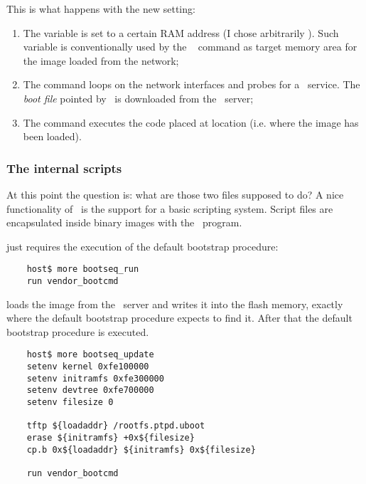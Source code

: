         This is what happens with the new setting:
        \begin{enumerate}
        \item   The  variable is set to a certain RAM
                address (I chose arbitrarily ). Such
                variable is conventionally used by the \uBoot\
                 command as target memory area for the image
                loaded from the network;
        \item   The  command loops on the network interfaces
                and probes for a \BootP\ service. The \emph{boot file}
                pointed by \BootP\ is downloaded from the \TFTP\ server;
        \item   The \Command{source} command executes the code placed at
                location \Const{0x100000} (i.e. where the image has been
                loaded).
        \end{enumerate}

    \subsubsection{The internal scripts}

        At this point the question is: what are those two files supposed to
        do? A nice functionality of \uBoot\ is the support for a basic
        scripting system. Script files are encapsulated inside binary
        images with the \mkimage\ program.

         just requires the execution of the default
        bootstrap procedure:
\begin{lstlisting}
    host$ more bootseq_run
    run vendor_bootcmd
\end{lstlisting}

         loads the 
        image from the \TFTP\ server and writes it into the flash memory,
       exactly where the default bootstrap procedure expects to find it.
        After that the default bootstrap procedure is executed.
\begin{lstlisting}
    host$ more bootseq_update
    setenv kernel 0xfe100000
    setenv initramfs 0xfe300000
    setenv devtree 0xfe700000
    setenv filesize 0

    tftp ${loadaddr} /rootfs.ptpd.uboot
    erase ${initramfs} +0x${filesize}
    cp.b 0x${loadaddr} ${initramfs} 0x${filesize}

    run vendor_bootcmd
\end{lstlisting}

